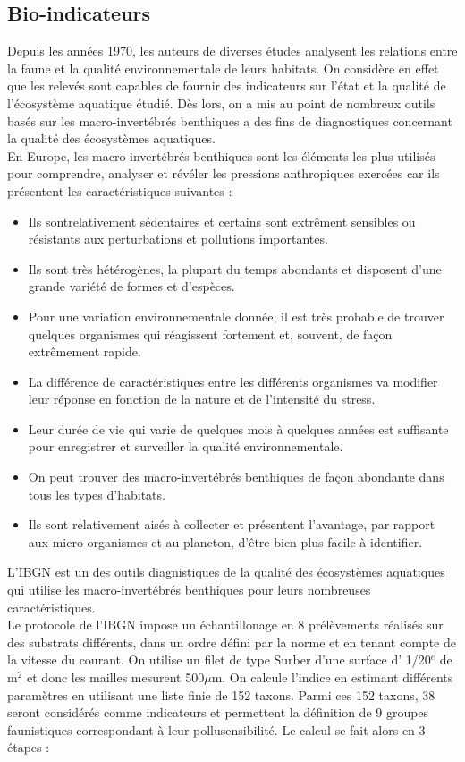 \documentclass[10pt, conference, compsocconf]{llncs}
\begin{document}
		\subsection{Bio-indicateurs}
			Depuis les années 1970, les auteurs de diverses études analysent les relations entre la faune et la qualité environnementale de leurs habitats. On considère en effet que les relevés sont capables de fournir des indicateurs sur l'état et la qualité de l'écosystème aquatique étudié. Dès lors, on a mis au point de nombreux outils basés sur les macro-invertébrés benthiques a des fins de diagnostiques concernant la qualité des écosystèmes aquatiques.\\
			En Europe, les macro-invertébrés benthiques sont les éléments les plus utilisés pour comprendre, analyser et révéler les pressions anthropiques exercées car ils présentent les caractéristiques suivantes :
			\begin{itemize}
				\item Ils sontrelativement sédentaires et certains sont extrêment sensibles ou résistants aux perturbations et pollutions importantes.
				\item Ils sont très hétérogènes, la plupart du temps abondants et disposent d'une grande variété de formes et d'espèces.
				\item Pour une variation environnementale donnée, il est très probable de trouver quelques organismes qui réagissent fortement et, souvent, de façon extrêmement rapide.
				\item La différence de caractéristiques entre les différents organismes va modifier leur réponse en fonction de la nature et de l'intensité du stress.
				\item Leur durée de vie qui varie de quelques mois à quelques années est suffisante pour enregistrer et surveiller la qualité environnementale.
				\item On peut trouver des macro-invertébrés benthiques de façon abondante dans tous les types d'habitats.
				\item Ils sont relativement aisés à collecter et présentent l'avantage, par rapport aux micro-organismes et au plancton, d'être bien plus facile à identifier.
			\end{itemize}
			L'IBGN est un des outils diagnistiques de la qualité des écosystèmes aquatiques qui utilise les macro-invertébrés benthiques pour leurs nombreuses caractéristiques. \\
			Le protocole de l'IBGN impose un échantillonage en 8 prélèvements réalisés sur des substrats différents, dans un ordre défini par la norme et en tenant compte de la vitesse du courant. On utilise un filet de type Surber d'une surface d' 1/20$^e$ de m$^2$ et donc les mailles mesurent 500$\mu$m. On calcule l'indice en estimant différents paramètres en utilisant une liste finie de 152 taxons. Parmi ces 152 taxons, 38 seront considérés comme indicateurs et permettent la définition de 9 groupes faunistiques correspondant à leur pollusensibilité. Le calcul se fait alors en 3 étapes :
\end{document}
